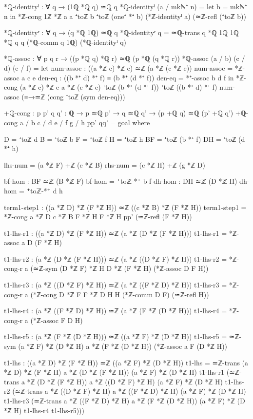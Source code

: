 \documentclass[11pt,a4paper]{book}
\begin{document}
\begin{code}
*ℚ-identityˡ : ∀ q → (1ℚ *ℚ q) ≃ℚ q
*ℚ-identityˡ (a / mkℕ⁺ n) = 
  let b = mkℕ⁺ n
  in *ℤ-cong {1ℤ *ℤ a} {a} {⁺toℤ b} {⁺toℤ (one⁺ *⁺ b)}
          (*ℤ-identityˡ a)
          (≃ℤ-refl (⁺toℤ b))

*ℚ-identityʳ : ∀ q → (q *ℚ 1ℚ) ≃ℚ q
*ℚ-identityʳ q = ≃ℚ-trans {q *ℚ 1ℚ} {1ℚ *ℚ q} {q} (*ℚ-comm q 1ℚ) (*ℚ-identityˡ q)

*ℚ-assoc : ∀ p q r → ((p *ℚ q) *ℚ r) ≃ℚ (p *ℚ (q *ℚ r))
*ℚ-assoc (a / b) (c / d) (e / f) =
  let num-assoc : ((a *ℤ c) *ℤ e) ≃ℤ (a *ℤ (c *ℤ e))
      num-assoc = *ℤ-assoc a c e
      den-eq : ((b *⁺ d) *⁺ f) ≡ (b *⁺ (d *⁺ f))
      den-eq = *⁺-assoc b d f
  in *ℤ-cong {(a *ℤ c) *ℤ e} {a *ℤ (c *ℤ e)} 
             {⁺toℤ (b *⁺ (d *⁺ f))} {⁺toℤ ((b *⁺ d) *⁺ f)}
             num-assoc (≡→≃ℤ (cong ⁺toℤ (sym den-eq)))

+ℚ-cong : {p p' q q' : ℚ} → p ≃ℚ p' → q ≃ℚ q' → (p +ℚ q) ≃ℚ (p' +ℚ q')
+ℚ-cong {a / b} {c / d} {e / f} {g / h} pp' qq' = goal
  where
    
    D = ⁺toℤ d
    B = ⁺toℤ b
    F = ⁺toℤ f
    H = ⁺toℤ h
    BF = ⁺toℤ (b *⁺ f)
    DH = ⁺toℤ (d *⁺ h)
    
    lhs-num = (a *ℤ F) +ℤ (e *ℤ B)
    rhs-num = (c *ℤ H) +ℤ (g *ℤ D)
    
    bf-hom : BF ≃ℤ (B *ℤ F)
    bf-hom = ⁺toℤ-*⁺ b f
    dh-hom : DH ≃ℤ (D *ℤ H)
    dh-hom = ⁺toℤ-*⁺ d h

    term1-step1 : ((a *ℤ D) *ℤ (F *ℤ H)) ≃ℤ ((c *ℤ B) *ℤ (F *ℤ H))
    term1-step1 = *ℤ-cong {a *ℤ D} {c *ℤ B} {F *ℤ H} {F *ℤ H} pp' (≃ℤ-refl (F *ℤ H))
    
    t1-lhs-r1 : ((a *ℤ D) *ℤ (F *ℤ H)) ≃ℤ (a *ℤ (D *ℤ (F *ℤ H)))
    t1-lhs-r1 = *ℤ-assoc a D (F *ℤ H)
    
    t1-lhs-r2 : (a *ℤ (D *ℤ (F *ℤ H))) ≃ℤ (a *ℤ ((D *ℤ F) *ℤ H))
    t1-lhs-r2 = *ℤ-cong-r a (≃ℤ-sym {(D *ℤ F) *ℤ H} {D *ℤ (F *ℤ H)} (*ℤ-assoc D F H))
    
    t1-lhs-r3 : (a *ℤ ((D *ℤ F) *ℤ H)) ≃ℤ (a *ℤ ((F *ℤ D) *ℤ H))
    t1-lhs-r3 = *ℤ-cong-r a (*ℤ-cong {D *ℤ F} {F *ℤ D} {H} {H} (*ℤ-comm D F) (≃ℤ-refl H))
    
    t1-lhs-r4 : (a *ℤ ((F *ℤ D) *ℤ H)) ≃ℤ (a *ℤ (F *ℤ (D *ℤ H)))
    t1-lhs-r4 = *ℤ-cong-r a (*ℤ-assoc F D H)
    
    t1-lhs-r5 : (a *ℤ (F *ℤ (D *ℤ H))) ≃ℤ ((a *ℤ F) *ℤ (D *ℤ H))
    t1-lhs-r5 = ≃ℤ-sym {(a *ℤ F) *ℤ (D *ℤ H)} {a *ℤ (F *ℤ (D *ℤ H))} (*ℤ-assoc a F (D *ℤ H))
    
    t1-lhs : ((a *ℤ D) *ℤ (F *ℤ H)) ≃ℤ ((a *ℤ F) *ℤ (D *ℤ H))
    t1-lhs = ≃ℤ-trans {(a *ℤ D) *ℤ (F *ℤ H)} {a *ℤ (D *ℤ (F *ℤ H))} {(a *ℤ F) *ℤ (D *ℤ H)} t1-lhs-r1
             (≃ℤ-trans {a *ℤ (D *ℤ (F *ℤ H))} {a *ℤ ((D *ℤ F) *ℤ H)} {(a *ℤ F) *ℤ (D *ℤ H)} t1-lhs-r2
             (≃ℤ-trans {a *ℤ ((D *ℤ F) *ℤ H)} {a *ℤ ((F *ℤ D) *ℤ H)} {(a *ℤ F) *ℤ (D *ℤ H)} t1-lhs-r3
             (≃ℤ-trans {a *ℤ ((F *ℤ D) *ℤ H)} {a *ℤ (F *ℤ (D *ℤ H))} {(a *ℤ F) *ℤ (D *ℤ H)} t1-lhs-r4 t1-lhs-r5)))
    

\end{code}
\end{document}
